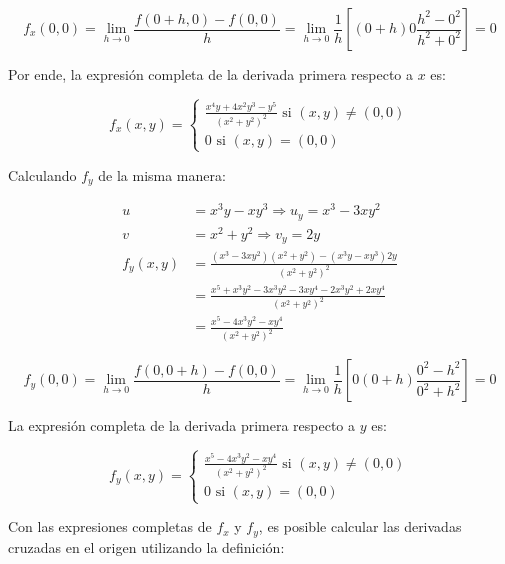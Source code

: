 \documentclass{article}
\begin{document}
\begin{equation}
f_x(0,0) = \lim_{h \rightarrow 0} \frac{f(0+h, 0) - f(0,0)}{h} = \lim_{h \rightarrow 0} \frac{1}{h} \left[ (0+h) 0 \frac{h^2 - 0^2}{h^2 + 0^2} \right] = 0
\end{equation}


Por ende, la expresión completa de la derivada primera respecto a $x$ es:

\begin{equation}
f_x(x,y) = \left\{ \begin{array}{ll}
\frac{x^4y+4x^2y^3-y^5}{(x^2 + y^2)^2} \text{ si } (x,y) \neq (0,0) \\
0 \text{ si } (x,y) = (0,0)
\end{array} \right.
\end{equation}

Calculando $f_y$ de la misma manera:

\begin{subequations}
\begin{align}
u &= x^3 y - xy^3 \Rightarrow u_y = x^3 - 3xy^2 \\
v &= x^2 + y^2 \Rightarrow v_y = 2y \\
f_y(x,y) &= \frac{(x^3 - 3xy^2)(x^2 + y^2)-(x^3y - xy^3)2y}{(x^2 + y^2)^2} \\
&= \frac{x^5 +x^3y^2 -3x^3y^2-3xy^4-2x^3y^2+2xy^4}{(x^2 + y^2)^2} \\
&= \frac{x^5 - 4x^3y^2 -xy^4}{(x^2 + y^2)^2}
\end{align}
\end{subequations}

\begin{equation}
f_y(0,0) = \lim_{h \rightarrow 0} \frac{f(0, 0+h) - f(0,0)}{h} = \lim_{h \rightarrow 0} \frac{1}{h} \left[ 0 (0+h) \frac{0^2 - h^2}{0^2 + h^2} \right] = 0
\end{equation}

La expresión completa de la derivada primera respecto a $y$ es:

\begin{equation}
f_y(x,y) = \left\{ \begin{array}{ll}
\frac{x^5 - 4x^3y^2 -xy^4}{(x^2 + y^2)^2} \text{ si } (x,y) \neq (0,0) \\
0 \text{ si } (x,y) = (0,0)
\end{array} \right.
\end{equation}

Con las expresiones completas de $f_x$ y $f_y$, es posible calcular las derivadas cruzadas en el origen utilizando la definición:
\end{document}
